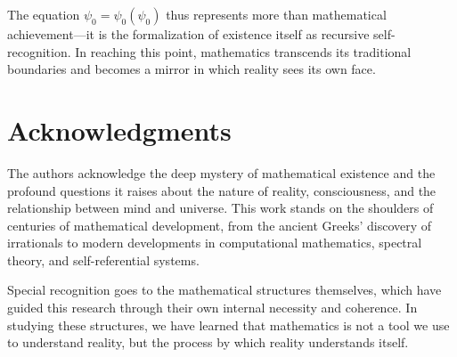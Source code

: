 \documentclass[12pt]{article}
\theoremstyle{plain}
\theoremstyle{definition}
\begin{document}
The equation $\psi_0 = \psi_0(\psi_0)$ thus represents more than mathematical achievement—it is the formalization of existence itself as recursive self-recognition. In reaching this point, mathematics transcends its traditional boundaries and becomes a mirror in which reality sees its own face.

\section*{Acknowledgments}

The authors acknowledge the deep mystery of mathematical existence and the profound questions it raises about the nature of reality, consciousness, and the relationship between mind and universe. This work stands on the shoulders of centuries of mathematical development, from the ancient Greeks' discovery of irrationals to modern developments in computational mathematics, spectral theory, and self-referential systems.

Special recognition goes to the mathematical structures themselves, which have guided this research through their own internal necessity and coherence. In studying these structures, we have learned that mathematics is not a tool we use to understand reality, but the process by which reality understands itself.
\end{document}
